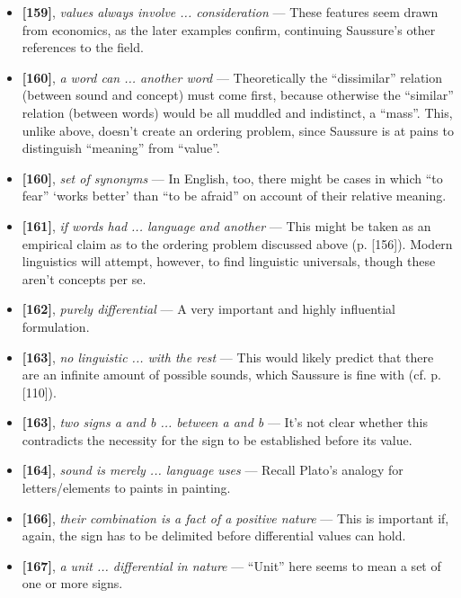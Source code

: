 \documentclass[12pt]{article}
\begin{document}
\begin{itemize}
\item \textbf{[159]}, \textit{values always involve ... consideration} --- These features seem drawn from economics, as the later examples confirm, continuing Saussure's other references to the field.

\item \textbf{[160]}, \textit{a word can ... another word} --- Theoretically the ``dissimilar'' relation (between sound and concept) must come first, because otherwise the ``similar'' relation (between words) would be all muddled and indistinct, a ``mass''. This, unlike above, doesn't create an ordering problem, since Saussure is at pains to distinguish ``meaning'' from ``value''.

\item \textbf{[160]}, \textit{set of synonyms} --- In English, too, there might be cases in which ``to fear'' `works better' than ``to be afraid'' on account of their relative meaning.

\item \textbf{[161]}, \textit{if words had ... language and another} --- This might be taken as an empirical claim as to the ordering problem discussed above (p. [156]). Modern linguistics will attempt, however, to find linguistic universals, though these aren't concepts per se.

\item \textbf{[162]}, \textit{purely differential} --- A very important and highly influential formulation.

\item \textbf{[163]}, \textit{no linguistic ... with the rest} --- This would likely predict that there are an infinite amount of possible sounds, which Saussure is fine with (cf. p. [110]).

\item \textbf{[163]}, \textit{two signs a and b ... between a and b} --- It's not clear whether this contradicts the necessity for the sign to be established before its value.

\item \textbf{[164]}, \textit{sound is merely ... language uses} --- Recall Plato's analogy for letters/elements to paints in painting. 

\item \textbf{[166]}, \textit{their combination is a fact of a positive nature} --- This is important if, again, the sign has to be delimited before differential values can hold.

\item \textbf{[167]}, \textit{a unit ... differential in nature} --- ``Unit'' here seems to mean a set of one or more signs.

\end{itemize}
\end{document}

